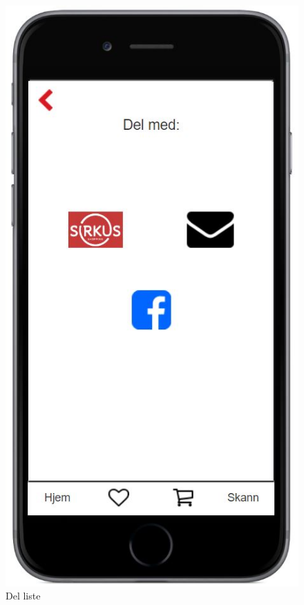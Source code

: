\begin{figure}[H]
\includegraphics[scale=0.55]{images/axurebilder/del}
\centering %
\caption{Del liste}
\label{fig:del}
\end{figure}

